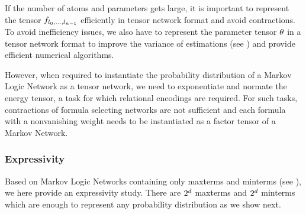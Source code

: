 If the number of atoms and parameters gets large, it is important to represent the tensor ${f_{l_{0},\ldots,l_{n-1}}}$ efficiently in tensor network format and avoid contractions.
To avoid inefficiency issues, we also have to represent the parameter tensor $\theta$ in a tensor network format to improve the variance of estimations (see ) and provide efficient numerical algorithms.

However, when required to instantiate the probability distribution of a Markov Logic Network as a tensor network, we need to exponentiate and normate the energy tensor, a task for which relational encodings are required.
For such tasks, contractions of formula selecting networks are not sufficient and each formula with a nonvanishing weight needs to be instantiated as a factor tensor of a Markov Network. 






\subsubsection{Expressivity}\label{sec:MLNMaxMintermRep}

Based on Markov Logic Networks containing only maxterms and minterms (see ), we here provide an expressivity study.
There are $2^{d}$ maxterms and $2^{d}$ minterms which are enough to represent any probability distribution as we show next.

